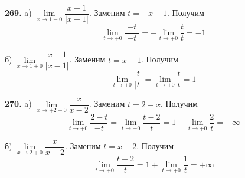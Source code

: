 \documentclass[12pt]{article}
\begin{document}
	\medskip
	{\bf 269.} a) $\lim\limits_{x\to1-0}\dfrac{x-1}{|x-1|}$. Заменим $t=-x+1$. Получим
	\[
		\lim\limits_{t\to+0}\dfrac{-t}{|-t|} = -\lim\limits_{t\to+0} \dfrac{t}{t} = -1
	\]
	
	\medskip
	б) $\lim\limits_{x\to1+0}\dfrac{x-1}{|x-1|}$. Заменим $t=x-1$. Получим
	\[
		\lim\limits_{t\to+0}\dfrac{t}{|t|} = \lim\limits_{t\to+0} \dfrac{t}{t} = 1
	\]	
	
	
	\medskip
	{\bf 270.} a) $\lim\limits_{x\to+2-0}\dfrac{x}{x-2}$. Заменим $t=2-x$. Получим
	\[
		\lim\limits_{t\to+0}\dfrac{2-t}{-t} = \lim\limits_{t\to+0} \dfrac{t-2}{t} = 1-\lim\limits_{t\to+0}\dfrac{2}{t} = -\infty
	\]
	
	
	б) $\lim\limits_{x\to2+0}\dfrac{x}{x-2}$. Заменим $t=x-2$. Получим
	\[
		\lim\limits_{t\to+0}\dfrac{t+2}{t} = 1+\lim\limits_{t\to+0}\dfrac{1}{t} = +\infty
	\]
	
	
	
	
	
	
	
	
	
	
	
	
	
	
	
	
	
	
	
	
	
	
	
	
\end{document}
